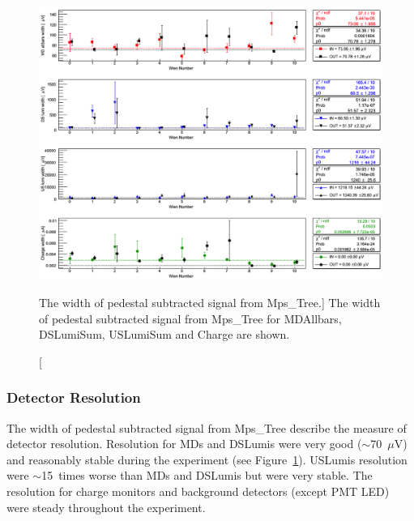 \begin{singlespace}
\begin{figure}[!h]
	\centering
	\includegraphics[width=15.0cm]{figures/pedestalSumWidth}
	\caption
	[The width of pedestal subtracted signal from Mps\_Tree.]
	{The width of pedestal subtracted signal from Mps\_Tree for MDAllbars, DSLumiSum, USLumiSum and Charge are shown.}
	\label{fig:pedestalSumWidth}
\end{figure}
\end{singlespace}

\subsubsection{Detector Resolution}
\label{Detector Resolution}

The width of pedestal subtracted signal from Mps\_Tree describe the measure of detector resolution. Resolution for MDs and DSLumis were very good ($\sim$70~$\mu$V) and reasonably stable during the experiment (see Figure~\ref{fig:pedestalSumWidth}). USLumis resolution were $\sim$15~times worse than MDs and DSLumis but were very stable. The resolution for charge monitors and background detectors (except PMT LED) were steady throughout the experiment. 

